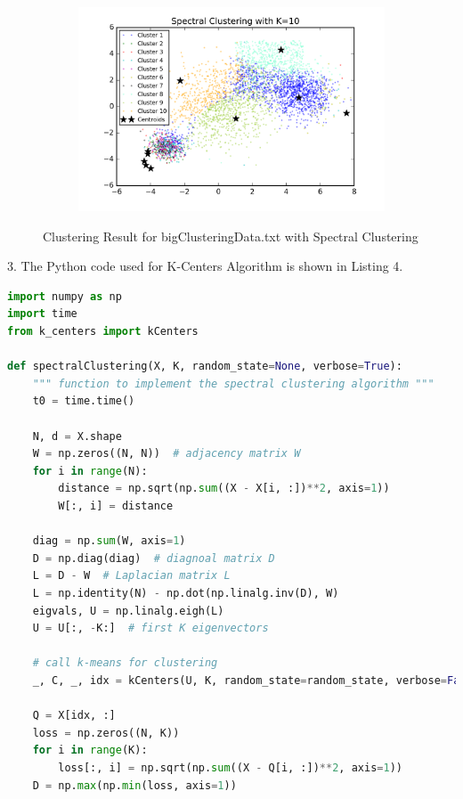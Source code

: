 \begin{description}
\begin{description}
\begin{figure}[!h]
\begin{subfigure}[b]{0.475\textwidth}
            \includegraphics[width=\textwidth]{./figures/bigClustering_spectral_10.png}
        \end{subfigure}
        
        \caption{Clustering Result for bigClusteringData.txt with Spectral Clustering}
        \label{fig:spectral_bigClustering}
\end{figure}

\newpage
\item{3.} The Python code used for K-Centers Algorithm is shown in Listing 4.

\begin{lstlisting}[language=Python, caption=Spectral Clustering Algorithm Python Code]
import numpy as np
import time
from k_centers import kCenters

def spectralClustering(X, K, random_state=None, verbose=True):
    """ function to implement the spectral clustering algorithm """
    t0 = time.time()

    N, d = X.shape
    W = np.zeros((N, N))  # adjacency matrix W
    for i in range(N):
        distance = np.sqrt(np.sum((X - X[i, :])**2, axis=1))
        W[:, i] = distance

    diag = np.sum(W, axis=1)
    D = np.diag(diag)  # diagnoal matrix D
    L = D - W  # Laplacian matrix L
    L = np.identity(N) - np.dot(np.linalg.inv(D), W)
    eigvals, U = np.linalg.eigh(L)
    U = U[:, -K:]  # first K eigenvectors

    # call k-means for clustering
    _, C, _, idx = kCenters(U, K, random_state=random_state, verbose=False)

    Q = X[idx, :]
    loss = np.zeros((N, K))
    for i in range(K):
        loss[:, i] = np.sqrt(np.sum((X - Q[i, :])**2, axis=1))
    D = np.max(np.min(loss, axis=1))


\end{lstlisting}
\end{description}
\end{description}
